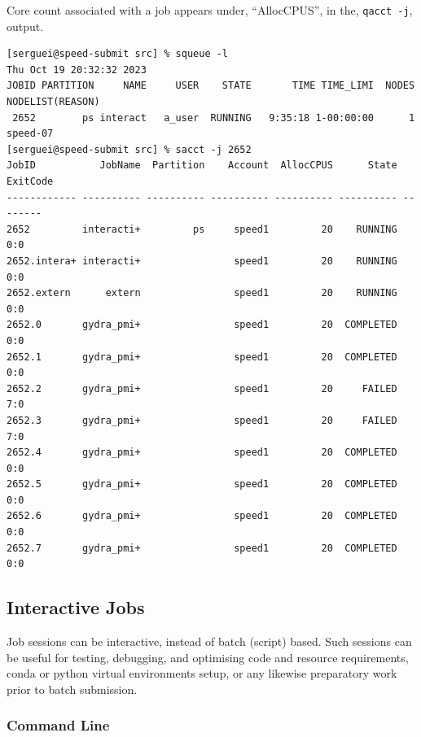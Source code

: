 Core count associated with a job appears under,
``AllocCPUS'', in the, \texttt{qacct -j}, output.

\small
\begin{verbatim}
[serguei@speed-submit src] % squeue -l
Thu Oct 19 20:32:32 2023
JOBID PARTITION     NAME     USER    STATE       TIME TIME_LIMI  NODES NODELIST(REASON)
 2652        ps interact   a_user  RUNNING   9:35:18 1-00:00:00      1 speed-07
[serguei@speed-submit src] % sacct -j 2652
JobID           JobName  Partition    Account  AllocCPUS      State ExitCode
------------ ---------- ---------- ---------- ---------- ---------- --------
2652         interacti+         ps     speed1         20    RUNNING      0:0
2652.intera+ interacti+                speed1         20    RUNNING      0:0
2652.extern      extern                speed1         20    RUNNING      0:0
2652.0       gydra_pmi+                speed1         20  COMPLETED      0:0
2652.1       gydra_pmi+                speed1         20  COMPLETED      0:0
2652.2       gydra_pmi+                speed1         20     FAILED      7:0
2652.3       gydra_pmi+                speed1         20     FAILED      7:0
2652.4       gydra_pmi+                speed1         20  COMPLETED      0:0
2652.5       gydra_pmi+                speed1         20  COMPLETED      0:0
2652.6       gydra_pmi+                speed1         20  COMPLETED      0:0
2652.7       gydra_pmi+                speed1         20  COMPLETED      0:0
\end{verbatim}
\normalsize

\subsection{Interactive Jobs}
\label{sect:interactive-jobs}

Job sessions can be interactive, instead of batch (script) based. Such 
sessions can be useful for testing, debugging, and optimising code and resource 
requirements, conda or python virtual environments setup, or any likewise
preparatory work prior to batch submission.

\subsubsection{Command Line}

